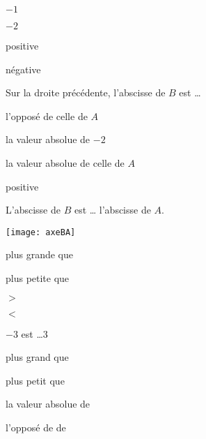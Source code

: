 \begin{QCM}
\begin{GroupeQCM}
\begin{exercice}
      \begin{ChoixQCM}{4}
      \item $-1$
      \item $-2$
      \item positive
      \item négative
      \end{ChoixQCM}
\begin{corrige}
   \end{corrige}
    \end{exercice}
    
    
     \begin{exercice}
      Sur la droite précédente, l'abscisse de $B$ est \ldots
      \begin{ChoixQCM}{4}
      \item l'opposé de celle de $A$
      \item la valeur absolue de $-2$
      \item la valeur absolue de celle de $A$
      \item positive
      \end{ChoixQCM}
\begin{corrige}
   \end{corrige}
    \end{exercice}
    

    \begin{exercice}
      L'abscisse de $B$ est \ldots \hspace{0.4em} l'abscisse de $A$. 
      
\vspace{-2em}
\begin{center} \texttt{[image: axeBA]} \end{center}

      \begin{ChoixQCM}{4}
      \item plus grande que
      \item plus petite que
      \item $>$
      \item $<$
      \end{ChoixQCM}
\begin{corrige}
   \end{corrige}
    \end{exercice}
    
 
     \begin{exercice}
      $-3$ est \ldots 3
      \begin{ChoixQCM}{4}
      \item plus grand que
      \item plus petit que
      \item la valeur absolue de
      \item l'opposé de de
      \end{ChoixQCM}
\begin{corrige}
   \end{corrige}
    \end{exercice}
 \end{GroupeQCM}
\end{QCM}
 
